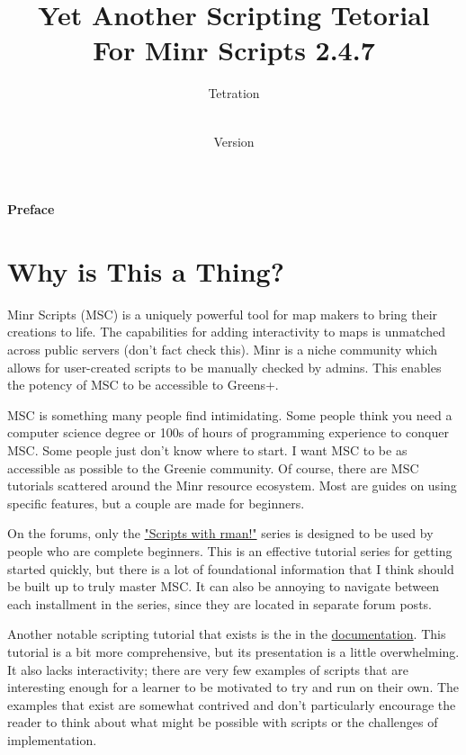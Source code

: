\documentclass[oneside]{book}
\newcommand{\prefacename}{Preface}
\newenvironment{preface}{
    \vspace*{\stretch{2}}
    {\noindent \bfseries \Huge \prefacename}
    \begin{center}
        \phantomsection \addcontentsline{toc}{chapter}{\prefacename} %
        \thispagestyle{plain}
    \end{center}%
}
{\vspace*{\stretch{5}}}
\begin{document}
\pagestyle{empty}

\title{Yet Another Scripting Tetorial \\
        \large For Minr Scripts 2.4.7}
\author{Tetration}
\date{\vhCurrentDate \\Version \vhCurrentVersion}
\maketitle


\frontmatter
{} 

\begin{preface}
\section*{Why is This a Thing?}
Minr Scripts (MSC) is a uniquely powerful tool for map makers to bring their creations to life. The capabilities for adding interactivity to maps is unmatched across public servers (don't fact check this). Minr is a niche community which allows for user-created scripts to be manually checked by admins. This enables the potency of MSC to be accessible to Greens+.

MSC is something many people find intimidating. Some people think you need a computer science degree or 100s of hours of programming experience to conquer MSC. Some people just don't know where to start. I want MSC to be as accessible as possible to the Greenie community. Of course, there are MSC tutorials scattered around the Minr resource ecosystem. Most are guides on using specific features, but a couple are made for beginners.

On the forums, only the \href{https://forums.minr.org/threads/scripts-with-rman-1-basic-script-understanding.3193/}{"Scripts with rman!"} series is designed to be used by people who are complete beginners. This is an effective tutorial series for getting started quickly, but there is a lot of foundational information that I think should be built up to truly master MSC. It can also be annoying to navigate between each installment in the series, since they are located in separate forum posts.

Another notable scripting tutorial that exists is the in the \href{https://msc-documentation.readthedocs.io/en/latest/tutorial.html}{documentation}. This tutorial is a bit more comprehensive, but its presentation is a little overwhelming. It also lacks interactivity; there are very few examples of scripts that are interesting enough for a learner to be motivated to try and run on their own. The examples that exist are somewhat contrived and don't particularly encourage the reader to think about what might be possible with scripts or the challenges of implementation.


\end{preface}
\end{document}
